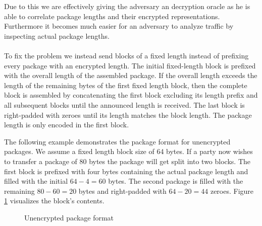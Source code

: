 Due to this we are effectively giving the adversary an decryption oracle as he is able to correlate package lengths and their encrypted representations.
Furthermore it becomes much easier for an adversary to analyze traffic by inspecting actual package lengths.
\\\\

To fix the problem we instead send blocks of a fixed length instead of prefixing every package with an encrypted length.
The initial fixed-length block is prefixed with the overall length of the assembled package.
If the overall length exceeds the length of the remaining bytes of the first fixed length block, then the complete block is assembled by concatenating the first block excluding its length prefix and all subsequent blocks until the announced length is received.
The last block is right-padded with zeroes until its length matches the block length.
The package length is only encoded in the first block.

The following example demonstrates the package format for unencrypted packages.
We assume a fixed length block size of 64 bytes.
If a party now wishes to transfer a package of 80 bytes the package will get split into two blocks.
The first block is prefixed with four bytes containing the actual package length and filled with the initial $64 - 4 = 60$ bytes.
The second package is filled with the remaining $80 - 60 = 20$ bytes and right-padded with $64 - 20 = 44$ zeroes.
Figure \ref{fig:unencrypted-package-format} visualizes the block's contents.

\begin{figure}
    \center


    \caption{Unencrypted package format}
    \label{fig:unencrypted-package-format}
\end{figure}

